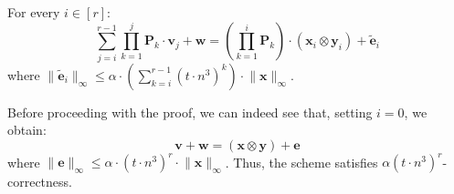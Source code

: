 \documentclass{theoretics}
\begin{document}
\begin{lemma}\label{lmm:correct}
For every $i\in[r]$:
\[\sum_{j=i}^{r-1} \prod_{k=1}^{j} \mathbf{P}_k\cdot\mathbf{v}_j+\mathbf{w}=\left(\prod_{k=1}^{i} \mathbf{P}_k\right)\cdot(\mathbf{x}_{i}\otimes \mathbf{y}_i)+\widetilde{\mathbf{e}}_i\]
where $\lVert \widetilde{\mathbf{e}}_i\rVert_\infty\le \alpha \cdot \left(\sum_{k=i}^{r-1} (t \cdot n^3)^k\right)\cdot \lVert \mathbf{x}\rVert_\infty$.
\end{lemma}
Before proceeding with the proof, we can indeed see that, setting $i=0$, we obtain:
\[\mathbf{v}+\mathbf{w}=(\mathbf{x}\otimes \mathbf{y})+\mathbf{e}\]
where $\lVert\mathbf{e}\rVert_\infty\le \alpha\cdot (t\cdot n^3)^r\cdot \lVert \mathbf{x}\rVert_\infty$.
Thus, the scheme satisfies $\alpha(t\cdot n^3)^r$-correctness.
\end{document}
